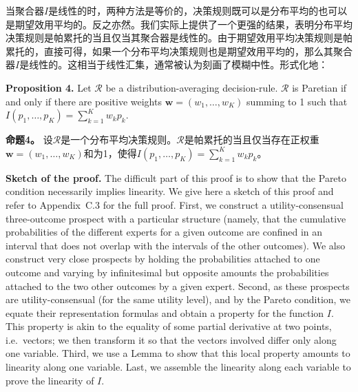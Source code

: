 \documentclass[12pt,a4paper]{article}
\newenvironment{original}
  {\par\noindent\ignorespaces}
  {\par}
\newenvironment{translation}
  {\par\noindent{\color{transblue}\ignorespaces}}
  {\par\medskip}
\begin{document}
\begin{translation}
当聚合器$I$是线性的时，两种方法是等价的，决策规则既可以是分布平均的也可以是期望效用平均的。反之亦然。我们实际上提供了一个更强的结果，表明分布平均决策规则是帕累托的当且仅当其聚合器是线性的。由于期望效用平均决策规则是帕累托的，直接可得，如果一个分布平均决策规则也是期望效用平均的，那么其聚合器$I$是线性的。这相当于线性汇集，通常被认为刻画了模糊中性。形式化地：
\end{translation}

\begin{original}
\textbf{Proposition 4.} Let $\mathcal{R}$ be a distribution-averaging decision-rule. $\mathcal{R}$ is Paretian if and only if there are positive weights $\mathbf{w} = (w_{1}, \dots, w_{K})$ summing to 1 such that $I(p_{1}, \dots, p_{K}) = \sum_{k=1}^{K} w_{k} p_{k}$.
\end{original}

\begin{translation}
\textbf{命题4。} 设$\mathcal{R}$是一个分布平均决策规则。$\mathcal{R}$是帕累托的当且仅当存在正权重$\mathbf{w} = (w_{1}, \dots, w_{K})$和为1，使得$I(p_{1}, \dots, p_{K}) = \sum_{k=1}^{K} w_{k} p_{k}$。
\end{translation}

\begin{original}
\textbf{Sketch of the proof.} The difficult part of this proof is to show that the Pareto condition necessarily implies linearity. We give here a sketch of this proof and refer to Appendix~C.3 for the full proof. First, we construct a utility-consensual three-outcome prospect with a particular structure (namely, that the cumulative probabilities of the different experts for a given outcome are confined in an interval that does not overlap with the intervals of the other outcomes). We also construct very close prospects by holding the probabilities attached to one outcome and varying by infinitesimal but opposite amounts the probabilities attached to the two other outcomes by a given expert. Second, as these prospects are utility-consensual (for the same utility level), and by the Pareto condition, we equate their representation formulas and obtain a property for the function $I$. This property is akin to the equality of some partial derivative at two points, i.e.\ vectors; we then transform it so that the vectors involved differ only along one variable. Third, we use a Lemma to show that this local property amounts to linearity along one variable. Last, we assemble the linearity along each variable to prove the linearity of $I$.
\end{original}
\end{document}
